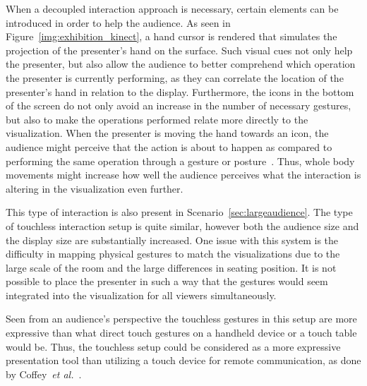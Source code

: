 \documentclass[review,journal]{vgtc}         %
\newcommand{\todo}[1]{\textbf{\textcolor{red}{[TODO: {#1}]}}}
\begin{document}
When a decoupled interaction approach is necessary, certain elements can be introduced in order to help the audience.
As seen in Figure~\ref{img:exhibition_kinect}, a hand cursor is rendered that simulates the projection of the presenter's hand on the surface.
Such visual cues not only help the presenter, but also allow the audience to better comprehend which operation the presenter is currently performing, as they can correlate the location of the presenter's hand in relation to the display.
Furthermore, the icons in the bottom of the screen do not only avoid an increase in the number of necessary gestures, but also to make the operations performed relate more directly to the visualization. 
When the presenter is moving the hand towards an icon, the audience might perceive that the action is about to happen as compared to performing the same operation through a gesture or posture~\cite{isenberg:hal-00781237}. 
Thus, whole body movements \cite{978-0-85729-432-6, Shoemaker:2010:BIT:1868914.1868967} might increase how well the audience perceives what the interaction is altering in the visualization even further.

This type of interaction is also present in Scenario~\ref{sec:largeaudience}. The type of touchless interaction setup is quite similar, however both the audience size and the display size are substantially increased.
One issue with this system is the difficulty in mapping physical gestures to match the visualizations due to the large scale of the room and the large differences in seating position.
It is not possible to place the presenter in such a way that the gestures would seem integrated into the visualization for all viewers simultaneously.

Seen from an audience's perspective the touchless gestures in this setup are more expressive than what direct touch gestures on a handheld device or a touch table would be.
Thus, the touchless setup could be considered as a more expressive presentation tool than utilizing a touch device for remote communication, as done by Coffey~\textit{et al.}~\cite{Coffey:2012:ISW:2360744.2360843}.




\end{document}
